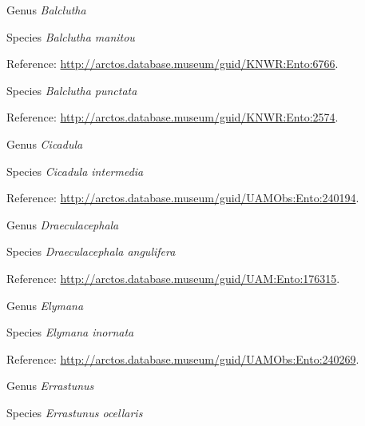 \documentclass[9pt, article]{memoir}
\begin{document}
\begin{multicols}{2}
\vspace{6pt}\noindent\hspace{30pt}Genus \textit{Balclutha}


\vspace{6pt}\noindent\hspace{36pt}Species \textit{Balclutha manitou}


Reference: 
\url{http://arctos.database.museum/guid/KNWR:Ento:6766}.

\vspace{6pt}\noindent\hspace{36pt}Species \textit{Balclutha punctata}


Reference: 
\url{http://arctos.database.museum/guid/KNWR:Ento:2574}.

\vspace{6pt}\noindent\hspace{30pt}Genus \textit{Cicadula}


\vspace{6pt}\noindent\hspace{36pt}Species \textit{Cicadula intermedia}


Reference: 
\url{http://arctos.database.museum/guid/UAMObs:Ento:240194}.

\vspace{6pt}\noindent\hspace{30pt}Genus \textit{Draeculacephala}


\vspace{6pt}\noindent\hspace{36pt}Species \textit{Draeculacephala angulifera}


Reference: 
\url{http://arctos.database.museum/guid/UAM:Ento:176315}.

\vspace{6pt}\noindent\hspace{30pt}Genus \textit{Elymana}


\vspace{6pt}\noindent\hspace{36pt}Species \textit{Elymana inornata}


Reference: 
\url{http://arctos.database.museum/guid/UAMObs:Ento:240269}.

\vspace{6pt}\noindent\hspace{30pt}Genus \textit{Errastunus}


\vspace{6pt}\noindent\hspace{36pt}Species \textit{Errastunus ocellaris}



\end{multicols}
\end{document}
